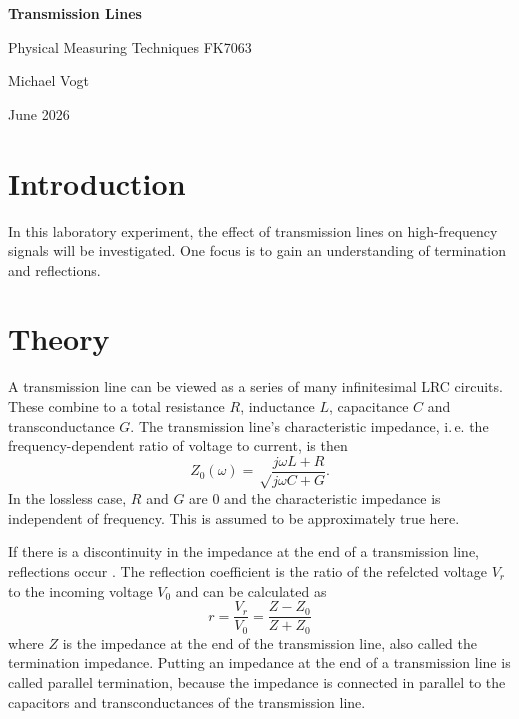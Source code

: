\documentclass[a4paper]{scrartcl}
\begin{document}
\begin{center}
\vspace*{1cm}

\LARGE
  \textbf{Transmission Lines}

\vspace{.2cm}

\normalsize
  Physical Measuring Techniques FK7063

\vspace{.5cm}
{Michael Vogt}

June 2026
\end{center}

\vspace{1cm}



\section*{Introduction}
In this laboratory experiment, the effect of transmission lines on high-frequency signals
will be investigated. One focus is to gain an understanding of termination and reflections.




\section{Theory}
A transmission line can be viewed as a series of many infinitesimal LRC circuits.
These combine to a total resistance $R$, inductance $L$, capacitance $C$ and transconductance $G$.
The transmission line's characteristic impedance, i.\,e. the frequency-dependent ratio of voltage to current,
is then \cite{manual-theory}
\begin{equation*}
  Z_0(\omega) = \sqrt\frac{j\omega L+R}{j\omega C+G}.
\end{equation*}
In the lossless case, $R$ and $G$ are $0$ and the characteristic impedance is independent of frequency.
This is assumed to be approximately true here.

If there is a discontinuity in the impedance at the end of a transmission line, reflections occur \cite{manual-theory}.
The reflection coefficient is the ratio of the refelcted voltage $V_r$ to the incoming voltage $V_0$
and can be calculated as \cite{manual-theory}
\begin{equation}
  r = \frac{V_r}{V_0} = \frac{Z-Z_0}{Z+Z_0} \label{eq:reflection-coefficient}
\end{equation}
where $Z$ is the impedance at the end of the transmission line, also called the termination impedance.
Putting an impedance at the end of a transmission line is called
parallel termination, because the impedance is connected in parallel to the capacitors and transconductances
of the transmission line.
\end{document}
